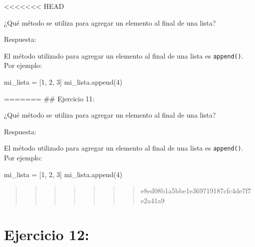 \documentclass[
  a4paper,
  DIV=11,
  numbers=noendperiod,
  onepage,
  openany]{scrreprt}
\newenvironment{Shaded}{\begin{snugshade}}{\end{snugshade}}
\newcommand{\DecValTok}[1]{\textcolor[rgb]{0.68,0.00,0.00}{#1}}
\newcommand{\NormalTok}[1]{\textcolor[rgb]{0.00,0.23,0.31}{#1}}
\newcommand{\OperatorTok}[1]{\textcolor[rgb]{0.37,0.37,0.37}{#1}}
\begin{document}
\textless\textless\textless\textless\textless\textless\textless{} HEAD

¿Qué método se utiliza para agregar un elemento al final de una lista?

Respuesta:

El método utilizado para agregar un elemento al final de una lista es
\texttt{append()}. Por ejemplo:

\begin{Shaded}
\begin{Highlighting}[]
\NormalTok{mi\_lista }\OperatorTok{=}\NormalTok{ [}\DecValTok{1}\NormalTok{, }\DecValTok{2}\NormalTok{, }\DecValTok{3}\NormalTok{]}
\NormalTok{mi\_lista.append(}\DecValTok{4}\NormalTok{)}
\end{Highlighting}
\end{Shaded}

======= \#\# Ejercicio 11:

¿Qué método se utiliza para agregar un elemento al final de una lista?

Respuesta:

El método utilizado para agregar un elemento al final de una lista es
\texttt{append()}. Por ejemplo:

\begin{Shaded}
\begin{Highlighting}[]
\NormalTok{mi\_lista }\OperatorTok{=}\NormalTok{ [}\DecValTok{1}\NormalTok{, }\DecValTok{2}\NormalTok{, }\DecValTok{3}\NormalTok{]}
\NormalTok{mi\_lista.append(}\DecValTok{4}\NormalTok{)}
\end{Highlighting}
\end{Shaded}

\begin{quote}
\begin{quote}
\begin{quote}
\begin{quote}
\begin{quote}
\begin{quote}
\begin{quote}
e8ed08b1a5bbe1e369719187cfc4de7f7e2a41a9
\end{quote}
\end{quote}
\end{quote}
\end{quote}
\end{quote}
\end{quote}
\end{quote}

\hypertarget{ejercicio-12}{%
\chapter{Ejercicio 12:}\label{ejercicio-12}}
\end{document}
